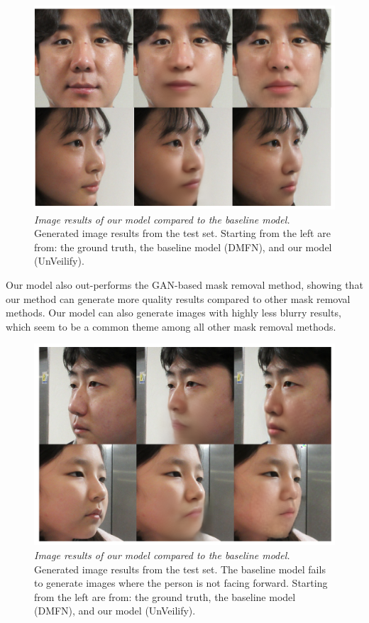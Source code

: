\documentclass[sigconf,authorversion,nonacm]{acmart}
\begin{document}
\begin{figure}[ht]
  \centering
  \includegraphics[width=0.8\linewidth]{images/good-results.png}
  \caption{\emph{Image results of our model compared to the baseline model.} Generated image 
  results from the test set. Starting from the left are from: the ground truth, the baseline model (DMFN), and our model (UnVeilify).}
  \label{images:good-results}
\end{figure}

Our model also out-performs the GAN-based mask removal method, showing that our method can generate more quality results compared to other mask removal methods. Our model can also generate images with highly less blurry results, which seem to be a common theme among all other mask removal methods.
\begin{figure}[ht]
  \centering
  \includegraphics[width=0.8\linewidth]{images/bad-2.png}
  \caption{\emph{Image results of our model compared to the baseline model.} Generated image 
  results from the test set. The baseline model fails to generate images where the person is not facing forward. Starting from the left are from: the ground truth, the baseline model (DMFN), and our model (UnVeilify).}
  \label{images:bad-results-2}
\end{figure}
\end{document}
